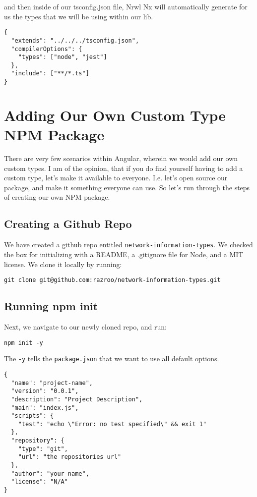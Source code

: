 and then inside of our tsconfig.json file, Nrwl Nx will automatically generate
for us the types that we will be using within our lib. 
\begin{lstlisting}[caption=libs/common/services/tsconfig.json]
{
  "extends": "../../../tsconfig.json",
  "compilerOptions": {
    "types": ["node", "jest"]
  },
  "include": ["**/*.ts"]
} 
\end{lstlisting}

\section{Adding Our Own Custom Type NPM Package}
There are very few scenarios within Angular, wherein we would add our own 
custom types. I am of the opinion, that if you do find yourself having to 
add a custom type, let's make it available to everyone. I.e. let's open source 
our package, and make it something everyone can use. So let's run through the 
steps of creating our own NPM package. 

\subsection{Creating a Github Repo}
We have created a github repo entitled \lstinline{network-information-types}. 
We checked the box for initializing with a README, a .gitignore file for Node,
and a MIT license. We clone it locally by running: 
\begin{verbatim}
git clone git@github.com:razroo/network-information-types.git
\end{verbatim}

\subsection{Running npm init}
Next, we navigate to our newly cloned repo, and run: 
\begin{verbatim}
npm init -y
\end{verbatim}
The \lstinline{-y} tells the \lstinline{package.json} that we want to use all
default options. 
\begin{lstlisting}[caption=package.json]  
{
  "name": "project-name",
  "version": "0.0.1",
  "description": "Project Description",
  "main": "index.js",
  "scripts": {
    "test": "echo \"Error: no test specified\" && exit 1"
  },
  "repository": {
    "type": "git",
    "url": "the repositories url"
  },
  "author": "your name",
  "license": "N/A"
}
\end{lstlisting}

